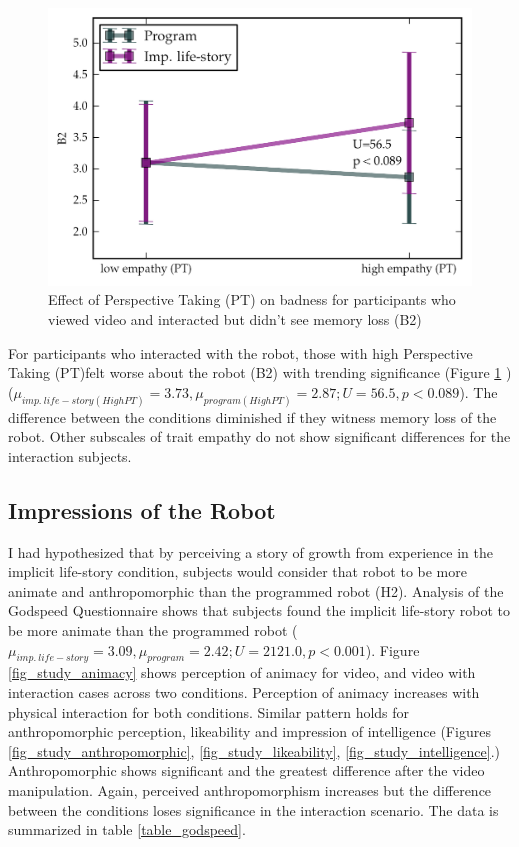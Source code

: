     \begin{figure}[thpb]
      \centering
      \includegraphics[width=4.6in]{figures/study/rev2/empathy/pt_u.png}
      \caption{Effect of Perspective Taking (PT) on badness for participants who viewed video and interacted but didn't see memory loss (B2)}
      \label{fig_study_pt_u}
   \end{figure}

For participants who interacted with the robot, those with high Perspective Taking (PT)felt worse about the robot (B2) with trending significance (Figure \ref{fig_study_pt_u} ) ($\mu_{imp.\ life-story (High PT)}=3.73, \mu_{program (High PT)}=2.87; U=56.5, p < 0.089$). The difference between the conditions diminished if they witness memory loss of the robot. Other subscales of trait empathy do not show significant differences for the interaction subjects. 



\subsection{Impressions of the Robot}

I had hypothesized that by perceiving a story of growth from experience in the implicit life-story condition, subjects would consider that robot to be more animate and anthropomorphic than the programmed robot (H2). Analysis of the Godspeed Questionnaire shows that subjects found the implicit life-story robot to be more animate than the programmed robot ($\mu_{imp.\ life-story}=3.09, \mu_{program}=2.42; U=2121.0, p < 0.001$). Figure \ref{fig_study_animacy} shows perception of animacy for video, and video with interaction cases across two conditions. Perception of animacy increases with physical interaction for both conditions. Similar pattern holds for anthropomorphic perception, likeability and impression of intelligence (Figures \ref{fig_study_anthropomorphic}, \ref{fig_study_likeability}, \ref{fig_study_intelligence}.) Anthropomorphic shows significant and the greatest difference after the video manipulation. Again, perceived anthropomorphism increases but the difference between the conditions loses significance in the interaction scenario. The data is summarized in table \ref{table_godspeed}.

